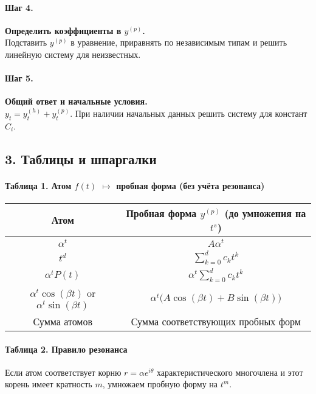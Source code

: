 \paragraph{Шаг 4.} \textbf{Определить коэффициенты в \(y^{(p)}\).}\\
Подставить \(y^{(p)}\) в уравнение, приравнять по независимым типам и решить линейную систему для неизвестных.

\paragraph{Шаг 5.} \textbf{Общий ответ и начальные условия.}\\
\(y_t=y^{(h)}_t+y^{(p)}_t\). При наличии начальных данных решить систему для констант \(C_i\).

\subsection*{3. Таблицы и шпаргалки}

\paragraph{Таблица 1. Атом \(f(t)\) $\mapsto$ пробная форма (без учёта резонанса)}
\begin{center}
\begin{tabular}{|c|c|}
\hline
\textbf{Атом} & \textbf{Пробная форма \(y^{(p)}\) (до умножения на \(t^s\))} \\
\hline
\(\alpha^{t}\) & \(A\alpha^{t}\) \\
\hline
\(t^{d}\) & \(\displaystyle\sum_{k=0}^{d} c_k t^k\) \\
\hline
\(\alpha^{t}P(t)\) & \(\alpha^{t}\sum_{k=0}^d c_k t^k\) \\
\hline
\(\alpha^{t}\cos(\beta t)\) or \(\alpha^{t}\sin(\beta t)\) & \(\alpha^{t}\bigl(A\cos(\beta t)+B\sin(\beta t)\bigr)\) \\
\hline
Сумма атомов & Сумма соответствующих пробных форм \\
\hline
\end{tabular}
\end{center}

\vspace{6pt}
\paragraph{Таблица 2. Правило резонанса} Если атом соответствует корню \(r=\alpha e^{i\theta}\) характеристического многочлена и этот корень имеет кратность \(m\), умножаем пробную форму на \(t^{m}\).

